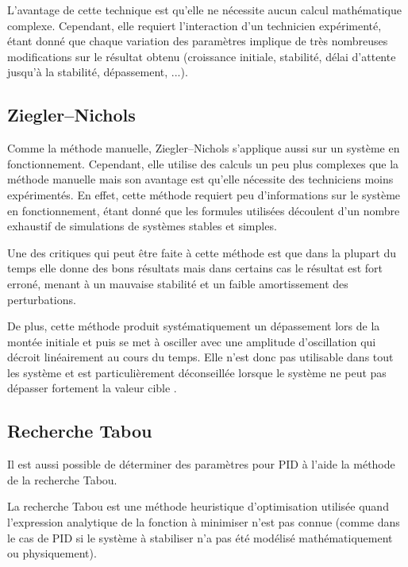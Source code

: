 \documentclass[a4paper,10pt]{report}
\begin{document}
L'avantage de cette technique est qu'elle ne nécessite aucun calcul mathématique complexe. Cependant, elle requiert l'interaction d'un technicien expérimenté, étant donné que chaque variation des paramètres implique de très nombreuses modifications sur le résultat obtenu (croissance initiale, stabilité, délai d'attente jusqu'à la stabilité, dépassement, ...). \cite{zhong2006pid}


\subsection{Ziegler–Nichols}
Comme la méthode manuelle, Ziegler–Nichols s'applique aussi sur un système en fonctionnement. Cependant, elle utilise des calculs un peu plus complexes que la méthode manuelle mais son avantage est qu'elle nécessite des techniciens moins expérimentés.\cite{ziegler1942optimum}
En effet, cette méthode requiert peu d'informations sur le système en fonctionnement, étant donné que les formules utilisées découlent d'un nombre exhaustif de simulations de systèmes stables et simples. \cite{silva2007pid}

Une des critiques qui peut être faite à cette méthode est que dans la plupart du temps elle donne des bons résultats mais dans certains cas le résultat est fort erroné,
menant à un mauvaise stabilité et un faible amortissement des perturbations.

De plus, cette méthode produit systématiquement un dépassement lors de la montée initiale et
puis se met à osciller avec une amplitude d'oscillation qui décroit linéairement au cours du temps.
Elle n'est donc pas utilisable dans tout les système
 et est particulièrement déconseillée lorsque le système ne peut pas dépasser fortement la valeur cible \cite{silva2007pid}.

\subsection{Recherche Tabou}

Il est aussi possible de déterminer des paramètres pour PID à l'aide la méthode de la recherche Tabou.

La recherche Tabou est une méthode heuristique d'optimisation utilisée quand l'expression analytique de la fonction à minimiser n'est pas connue
(comme dans le cas de PID si le système à stabiliser n'a pas été modélisé mathématiquement ou physiquement).
\end{document}
